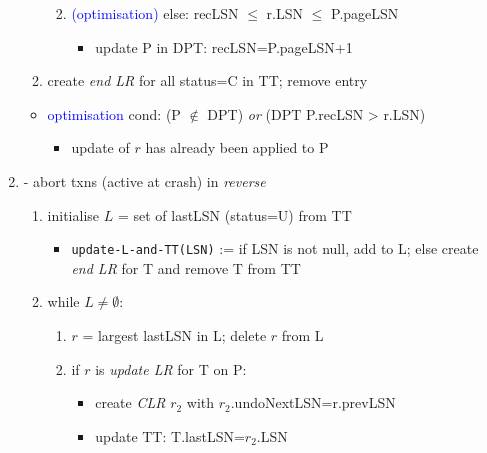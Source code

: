 \documentclass[10pt, landscape]{article}
\begin{document}
\begin{multicols*}{4}
\begin{enumerate}
\begin{enumerate}
\begin{enumerate}
\begin{itemize}
                          \end{itemize}
                    \item \textcolor{blue}{(optimisation)} else: recLSN $\leq$ r.LSN $\leq$ P.pageLSN
                          \begin{itemize}
                            \item update P in DPT: recLSN=P.pageLSN+1
                          \end{itemize}
                  \end{enumerate}
            \item create \textit{end LR} for all status=C in TT; remove entry
          \end{enumerate}
          \begin{itemize}
            \item \textcolor{blue}{optimisation} cond: (P $\not\in$ DPT) \textit{or} (DPT P.recLSN > r.LSN)
                  \begin{itemize}
                    \item update of $r$ has already been applied to P
                  \end{itemize}
          \end{itemize}
    \item {} - abort  txns (active at crash) in \textit{reverse}
          \begin{enumerate}
            \item initialise $L$ = set of lastLSN (status=U) from TT
                  \begin{itemize}
                    \item \texttt{update-L-and-TT(LSN)} := if LSN is not null, add to L; else create \textit{end LR} for T and remove T from TT
                  \end{itemize}
            \item while $L \neq \emptyset$:
                  \begin{enumerate}
                    \item $r$ = largest lastLSN in L; delete $r$ from L
                    \item if $r$ is \textit{update LR} for T on P:
                          \begin{itemize}
                            \item create \textit{CLR} $r_2$ with $r_2$.undoNextLSN=r.prevLSN
                            \item update TT: T.lastLSN=$r_2$.LSN

\end{itemize}
\end{enumerate}
\end{enumerate}
\end{enumerate}
\end{multicols*}
\end{document}
